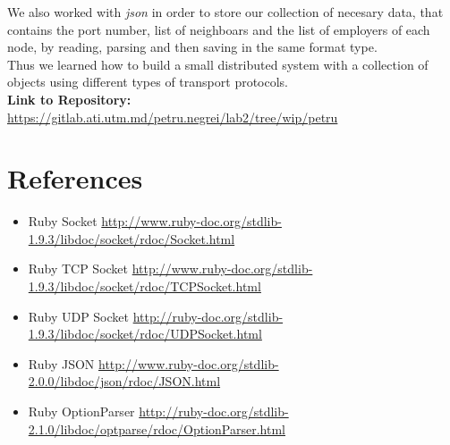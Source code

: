 \documentclass[12pt]{article}
\begin{document}
    We also worked with \textit{json} in order to store our collection of necesary data, that contains the port number, list of neighboars
    and the list of employers of each node, by reading, parsing and then saving in the same format type. \\

    Thus we learned how to build a small distributed system with a collection of objects using different types of transport protocols. \\

    \textbf{Link to Repository: } \url{https://gitlab.ati.utm.md/petru.negrei/lab2/tree/wip/petru}

   \section{References}

   \begin{itemize}
      \item Ruby Socket \url{http://www.ruby-doc.org/stdlib-1.9.3/libdoc/socket/rdoc/Socket.html}
      \item Ruby TCP  Socket \url{http://www.ruby-doc.org/stdlib-1.9.3/libdoc/socket/rdoc/TCPSocket.html}
      \item Ruby UDP Socket \url{http://ruby-doc.org/stdlib-1.9.3/libdoc/socket/rdoc/UDPSocket.html}
      \item Ruby JSON \url{http://www.ruby-doc.org/stdlib-2.0.0/libdoc/json/rdoc/JSON.html}
      \item Ruby OptionParser \url{http://ruby-doc.org/stdlib-2.1.0/libdoc/optparse/rdoc/OptionParser.html}
   \end{itemize}
\end{document}
